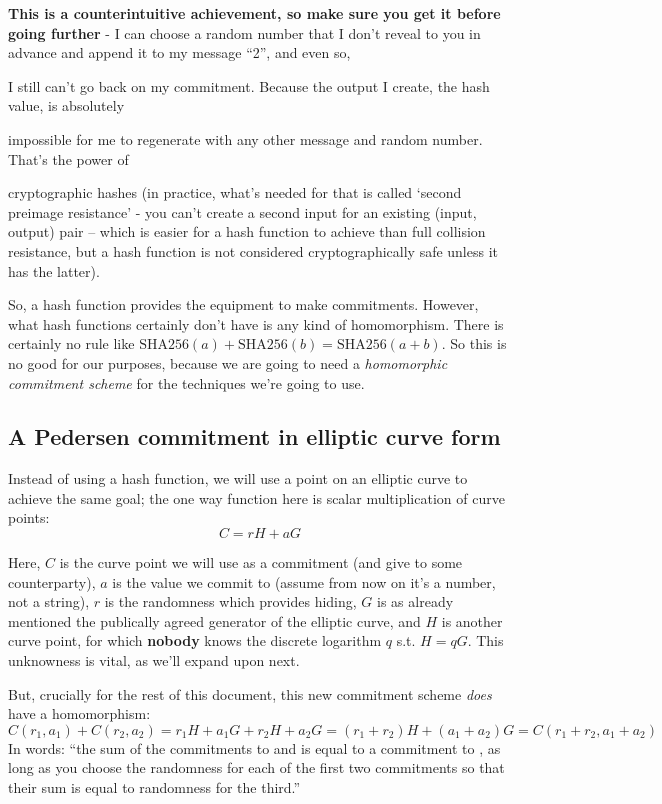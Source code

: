 \documentclass[10pt,a4paper]{article}
\begin{document}
\textbf{This is a counterintuitive achievement, so make sure you get it
before going further }- I can choose a random number that I don't reveal
to you in advance and append it to my message ``2'', and even so,

I still can't go back on my commitment. Because the output I create, the
hash value, is absolutely

impossible for me to regenerate with any other message and random
number. That's the power of

cryptographic hashes (in practice, what's needed for that is called
`second preimage resistance' - you can't create a second input for an
existing (input, output) pair -- which is easier for a hash function to
achieve than full collision resistance, but a hash function is not
considered cryptographically safe unless it has the latter).

So, a hash function provides the equipment to make commitments. However,
what hash functions certainly don't have is any kind of homomorphism.
There is certainly no rule like $\textrm{SHA256}(a) + \textrm{SHA256}(b) = \textrm{SHA256}(a+b)$. So this is no good for our purposes,
because we are going to need a \emph{homomorphic commitment scheme} for
the techniques we're going to use.

\hypertarget{a-pedersen-commitment-in-elliptic-curve-form}{%
\subsection[A Pedersen commitment in elliptic curve
form]{\texorpdfstring{\protect\hypertarget{anchor-15}{}{}A Pedersen
commitment in elliptic curve
form}{A Pedersen commitment in elliptic curve form}}\label{a-pedersen-commitment-in-elliptic-curve-form}}

Instead of using a hash function, we will use a point on an elliptic
curve to achieve the same goal; the one way function here is scalar
multiplication of curve points:
\[C = rH + aG \]

Here, $C$ is the curve point we will use as a commitment (and give to some
counterparty), $a$ is the value we commit to (assume from now on it's a
number, not a string), $r$ is the randomness which provides hiding, $G$ is as
already mentioned the publically agreed generator of the elliptic curve,
and $H$ is another curve point, for which \textbf{nobody} knows the discrete
logarithm $q$ s.t. $H=qG$. This unknowness is vital, as we'll expand upon next.

But, crucially for the rest of this document, this new commitment scheme
\emph{does} have a homomorphism:
\[C(r_1, a_1) + C(r_2, a_2) = r_1H + a_1G + r_2H + a_2G = (r_1 + r_2)H + (a_1 + a_2)G = C(r_1+r_2, a_1+a_2)\]
In words: ``the sum of the commitments to and is equal to a commitment
to , as long as you choose the randomness for each of the first two
commitments so that their sum is equal to randomness for the third.''
\end{document}

